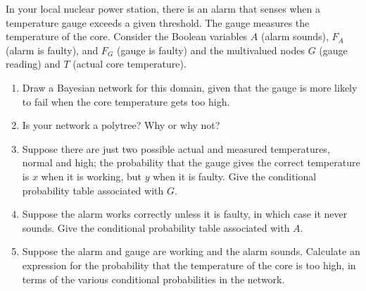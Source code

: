 \begin{exercise}
In your local nuclear power station, there is an
alarm that senses when a temperature gauge exceeds a given
threshold. The gauge measures the temperature of the core.  Consider the
Boolean variables \(A\) (alarm sounds), \(F_A\) (alarm is faulty), and
\(F_G\) (gauge is faulty) and the multivalued nodes \(G\) (gauge reading)
and \(T\) (actual core temperature).
\begin{enumerate}
\item Draw a Bayesian network for this domain, given that the gauge is more likely to
fail when the core temperature gets too high.

\item Is your network a polytree? Why or why not?

\item Suppose there are just two possible actual and measured
temperatures, normal and high; the probability that the gauge gives
the correct temperature is \(x\) when it is working, but \(y\) when it is
faulty. Give the conditional probability table associated with \(G\).

\item  Suppose the alarm works correctly unless it is faulty, in which case it
never sounds. Give the conditional probability table associated with \(A\).

\item  Suppose the alarm and gauge are working and the alarm
sounds. Calculate an expression for
the probability that the temperature of the core is too high, in terms of
the various conditional probabilities in the network.


\end{enumerate}
\end{exercise} 

